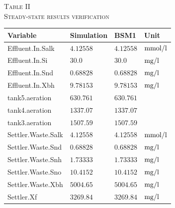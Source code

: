\begin{table}[h]
\begin{center}
    \textsc{\small{Table II}} \\[0.3pt]
    \textsc{Steady-state results verification}
\end{center}
\centering
\begin{tabular}{p{2.2cm} p{1.8cm} p{1.8cm} p{1.0cm}}
\hline
\bf{Variable}   & \bf{Simulation} & \bf{BSM1} & \bf{Unit} \\
\hline
Effluent.In.Salk & $4.12558$ & $4.12558$ & $\unit[]{mmol/l}$ \\
Effluent.In.Si & $30.0$ & $30.0$ & $\unit[]{mg/l}$ \\
Effluent.In.Snd & $0.68828$ & $0.68828$ & $\unit[]{mg/l}$ \\
Effluent.In.Xbh & $9.78153$ & $9.78153$ & $\unit[]{mg/l}$ \\
tank5.aeration & $630.761$ & $630.761$ &  \\
tank4.aeration & $1337.07$ & $1337.07$ &  \\
tank3.aeration & $1507.59$ & $1507.59$ &  \\
Settler.Waste.Salk & $4.12558$ & $4.12558$ & $\unit[]{mmol/l}$ \\
Settler.Waste.Snd & $0.68828$ & $0.68828$ & $\unit[]{mg/l}$ \\
Settler.Waste.Snh & $1.73333$ & $1.73333$ & $\unit[]{mg/l}$ \\
Settler.Waste.Sno & $10.4152$ & $10.4152$ & $\unit[]{mg/l}$ \\
Settler.Waste.Xbh & $5004.65$ & $5004.65$ & $\unit[]{mg/l}$ \\
Settler.Xf & $3269.84$ & $3269.84$ & $\unit[]{mg/l}$ \\
\hline
\end{tabular}
\label{tab:steady-state-results}
\end{table}

\newpage

